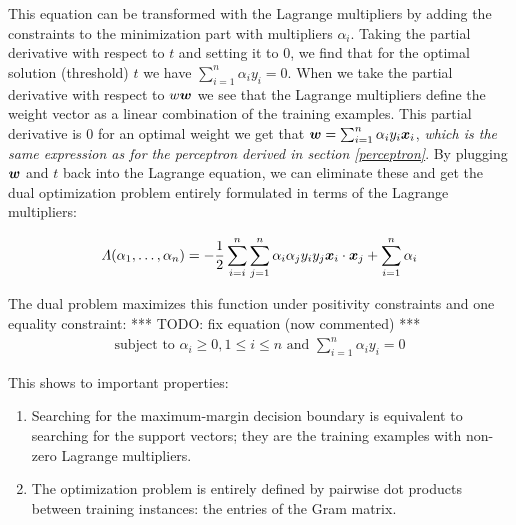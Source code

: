 This equation can be transformed with the Lagrange multipliers by adding the constraints to the minimization part with multipliers $\alpha_i$.
Taking the partial derivative with respect to $t$ and setting it to $0$, we find that for the optimal solution (threshold) $t$ we have $\sum_{i=1}^{n} \alpha_i y_i = 0$.
When we take the partial derivative with respect to $w\vectorsym{w}$ we see that the Lagrange multipliers define the weight vector as a linear combination of the training examples.
This partial derivative is $0$ for an optimal weight we get that $\vectorsym{w} = \sum_{i=1}^{n} \alpha_i y_i \vectorsym{x}_i$, \emph{which is the same expression as for the perceptron derived in section \ref{perceptron}}.
By plugging $\vectorsym{w}$ and $t$ back into the Lagrange equation, we can eliminate these and get the dual optimization problem entirely formulated in terms of the Lagrange multipliers:

\begin{equation}
  \Lambda(\alpha_1, \dots, \alpha_n) = - \frac{1}{2} \sum\limits_{i=i}^n \sum\limits_{j=1}^n \alpha_i \alpha_j y_i y_j \vectorsym{x}_i \cdot \vectorsym{x}_j + \sum\limits_{i=1}^n \alpha_i
\end{equation}

The dual problem maximizes this function under positivity constraints and one equality constraint:
*** TODO: fix equation (now commented) ***
\begin{equation}
\begin{aligned}
  \text{subject to } \alpha_i \geq 0, 1 \leq i \leq n \text{ and } \sum\limits_{i=1}^n \alpha_i y_i = 0
\end{aligned}
\end{equation}

This shows to important properties:
\begin{enumerate}
  \item Searching for the maximum-margin decision boundary is equivalent to searching for the support vectors; they are the training examples with non-zero Lagrange multipliers.
  \item The optimization problem is entirely defined by pairwise dot products between training instances: the entries of the Gram matrix.
\end{enumerate}

